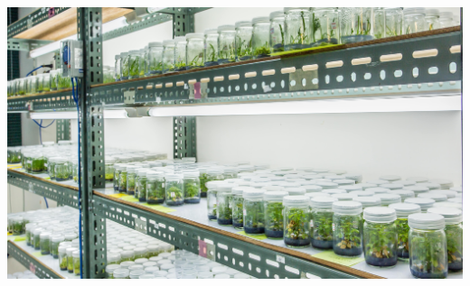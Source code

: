 \documentclass[
  ignorenonframetext,
  aspectratio=169]{beamer}
\begin{document}
\begin{frame}{}
\protect\hypertarget{section}{}
\begin{center}\includegraphics[width=0.98\linewidth]{../images/tissue-culture-equipments} \end{center}
\end{frame}
\end{document}
